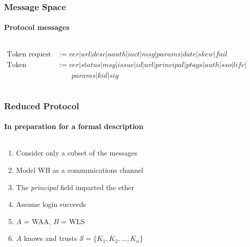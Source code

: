 \documentclass[handout, aspectratio=169, notes=hide]{beamer}
\begin{document}

\begin{frame}
\frametitle{Message Space}
\framesubtitle{Protocol messages}
\setlength{\parskip}{1.0em}
\begin{columns}[T]
\begin{column}[T]{1.0\textwidth}	

\begin{align*}
\text{Token request} & := \mathit{ver} | \mathit{url} | \mathit{desc} | \mathit{aauth} | \mathit{iact} | \mathit{msg} | \mathit{params} | \mathit{date} | \mathit{skew} | \mathit{fail} \\
\text{Token response} & := \mathit{ver} | \mathit{status} | \mathit{msg} | \mathit{issue} | \mathit{id} | \mathit{url} | \mathit{principal} | \mathit{ptags} | \mathit{auth} | \mathit{sso} | \mathit{life} | {} \\
& \qquad \mathit{params} | \mathit{kid} | \mathit{sig}
\end{align*}
\end{column}

\begin{column}[T]{0.0\textwidth}
\end{column}
\end{columns}

\end{frame}
\note{
}


\begin{frame}
\frametitle{Reduced Protocol}
\framesubtitle{In preparation for a formal description}
\setlength{\parskip}{1.0em}
\begin{columns}[T]
\begin{column}[T]{1.0\textwidth}	
\begin{enumerate}
\setlength{\parskip}{1.0em}
\item Consider only a subset of the messages
\item Model WB as a communications channel
\item The {\it principal} field imparted the ether
\item Assume login succeeds
\item $A$ = WAA, $B$ = WLS
\item $A$ knows and trusts $\mathcal{S} = \{K_1, K_2, ... , K_n\}$
\end{enumerate}
\end{column}

\begin{column}[T]{0.0\textwidth}
\end{column}
\end{columns}

\end{frame}
\note{
}
\end{document}
